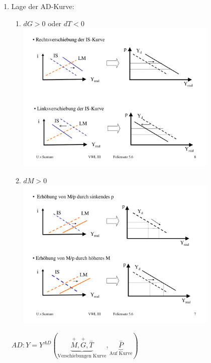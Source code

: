 \documentclass{scrartcl}
\begin{document}
\begin{enumerate}
  \item Lage der AD-Kurve:
  \begin{enumerate}
    \item $dG >0$ oder $dT<0$\\
      \includegraphics[width=0.8\textwidth]{Bilder/Neoklassische_Synthese_AD_Lage1.pdf}\\
    \item $dM >0$\\
        \includegraphics[width=0.8\textwidth]{Bilder/Neoklassische_Synthese_AD_Lage2.pdf}\\
  \end{enumerate}
  $AD: Y=Y^{AD}(\underbrace{\overset{+}{M},\overset{+}{G},\overset{-}{T}}_\text{Verschiebungen Kurve},\underbrace{\overset{-}{P}}_\text{Auf Kurve})$
\end{enumerate}
\end{document}
